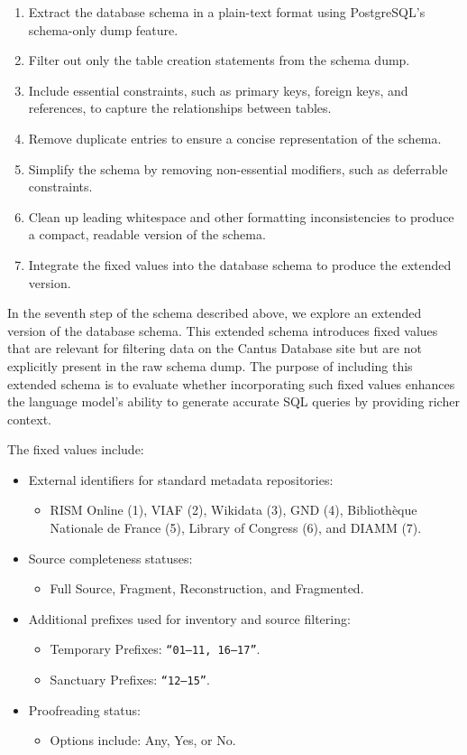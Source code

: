 \begin{enumerate}
    \item Extract the database schema in a plain-text format using PostgreSQL's schema-only dump feature.
    \item Filter out only the table creation statements from the schema dump.
    \item Include essential constraints, such as primary keys, foreign keys, and references, to capture the relationships between tables.
    \item Remove duplicate entries to ensure a concise representation of the schema.
    \item Simplify the schema by removing non-essential modifiers, such as deferrable constraints.
    \item Clean up leading whitespace and other formatting inconsistencies to produce a compact, readable version of the schema.
    \item Integrate the fixed values into the database schema to produce the extended version.
\end{enumerate}

In the seventh step of the schema described above, we explore an extended version of the database schema. This extended schema introduces fixed values that are relevant for filtering data on the Cantus Database site but are not explicitly present in the raw schema dump. The purpose of including this extended schema is to evaluate whether incorporating such fixed values enhances the language model's ability to generate accurate SQL queries by providing richer context.

The fixed values include:
\begin{itemize}
    \item External identifiers for standard metadata repositories:
    \begin{itemize}
        \item RISM Online (1), VIAF (2), Wikidata (3), GND (4), Biblioth\`{e}que Nationale de France (5), Library of Congress (6), and DIAMM (7).
    \end{itemize}
    \item Source completeness statuses:
    \begin{itemize}
        \item Full Source, Fragment, Reconstruction, and Fragmented.
    \end{itemize}
    \item Additional prefixes used for inventory and source filtering:
    \begin{itemize}
        \item Temporary Prefixes: \texttt{``01--11, 16--17''}.
        \item Sanctuary Prefixes: \texttt{``12--15''}.
    \end{itemize}
    \item Proofreading status:
    \begin{itemize}
        \item Options include: Any, Yes, or No.
    \end{itemize}
\end{itemize}


